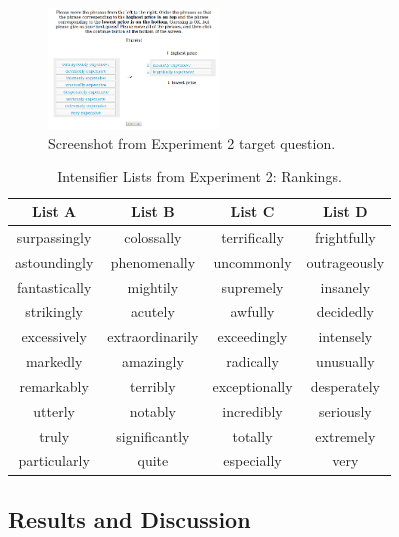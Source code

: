 \documentclass[10pt,letterpaper]{article}
\begin{document}
\begin{figure}[ht]
\begin{center}
\includegraphics[width=0.4\textwidth]{analysis_files_for_writeup/images/exp2-q.png}
\end{center}
\caption{Screenshot from Experiment 2 target question.} 
\label{exp2-q}
\end{figure}

\begin{table}[ht]
\begin{center} 
\footnotesize
\caption{Intensifier Lists from Experiment 2: Rankings.} 
\label{exp2-intensifiers} 
\vskip 0.12in
\begin{tabular}{cccc} 
\hline
List A    &  List B & List C & List D \\
\hline
surpassingly & colossally & terrifically & frightfully \\
astoundingly & phenomenally & uncommonly & outrageously \\
fantastically & mightily & supremely & insanely \\
strikingly & acutely & awfully & decidedly \\
excessively & extraordinarily & exceedingly & intensely \\
markedly & amazingly & radically & unusually \\
remarkably & terribly & exceptionally & desperately \\
utterly & notably & incredibly & seriously \\
truly & significantly & totally & extremely \\
particularly & quite & especially & very
\end{tabular}
\end{center}
\end{table}

\subsection{Results and Discussion}

\end{document}
